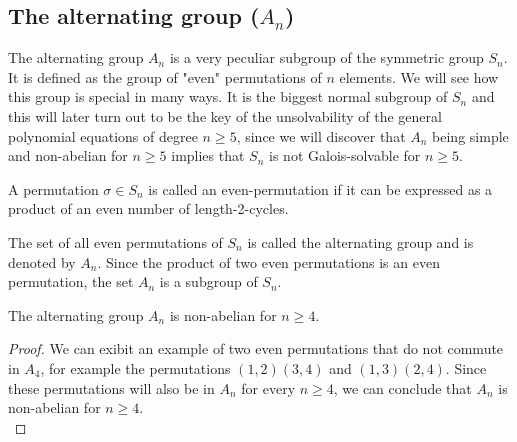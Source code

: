 \subsection{The alternating group ($A_n$)}
The alternating group $A_n$ is a very peculiar subgroup of the symmetric group $S_n$. It is 
defined as the group of "even" permutations of $n$ elements. We will see how this group is 
special in many ways. It is the biggest normal subgroup of $S_n$ and this will later turn 
out to be the key of the unsolvability of the general polynomial equations of degree $n \geq 5$, 
since we will discover that $A_n$ being simple and non-abelian for $n \geq 5$ implies that 
$S_n$ is not Galois-solvable for $n \geq 5$.

\begin{definition}
    A permutation $\sigma \in S_n$ is called an even-permutation if it can be expressed as a 
    product of an even number of length-2-cycles. 
\end{definition} \vspace{0.2em}

\begin{definition}
    The set of all even permutations of $S_n$ is called the alternating group and is denoted by
    $A_n$. Since the product of two even permutations is an even permutation, 
    the set $A_n$ is a subgroup of $S_n$. 
\end{definition} \vspace{0.2em}

\begin{lemma}
    The alternating group $A_n$ is non-abelian for $n \geq 4$.
\end{lemma}
\begin{proof}
    We can exibit an example of two even permutations that do not commute in $A_4$, 
    for example the permutations $(1,2)(3,4)$ and $(1,3)(2,4)$. Since these permutations 
    will also be in $A_n$ for every $n \geq 4$, we can conclude that $A_n$ is non-abelian for
    $n \geq 4$. \\
\end{proof} \vspace{0.2em}

